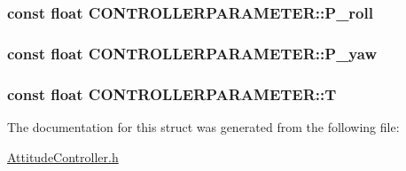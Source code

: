 \subsubsection[{\texorpdfstring{P\+\_\+roll}{P_roll}}]{\setlength{\rightskip}{0pt plus 5cm}const float C\+O\+N\+T\+R\+O\+L\+L\+E\+R\+P\+A\+R\+A\+M\+E\+T\+E\+R\+::\+P\+\_\+roll}\hypertarget{struct_c_o_n_t_r_o_l_l_e_r_p_a_r_a_m_e_t_e_r_a146c938d6d8675608d33ce61d2304000}{}\label{struct_c_o_n_t_r_o_l_l_e_r_p_a_r_a_m_e_t_e_r_a146c938d6d8675608d33ce61d2304000}
\subsubsection[{\texorpdfstring{P\+\_\+yaw}{P_yaw}}]{\setlength{\rightskip}{0pt plus 5cm}const float C\+O\+N\+T\+R\+O\+L\+L\+E\+R\+P\+A\+R\+A\+M\+E\+T\+E\+R\+::\+P\+\_\+yaw}\hypertarget{struct_c_o_n_t_r_o_l_l_e_r_p_a_r_a_m_e_t_e_r_a1d339345180b617cd8ab579c614c8896}{}\label{struct_c_o_n_t_r_o_l_l_e_r_p_a_r_a_m_e_t_e_r_a1d339345180b617cd8ab579c614c8896}
\subsubsection[{\texorpdfstring{T}{T}}]{\setlength{\rightskip}{0pt plus 5cm}const float C\+O\+N\+T\+R\+O\+L\+L\+E\+R\+P\+A\+R\+A\+M\+E\+T\+E\+R\+::T}\hypertarget{struct_c_o_n_t_r_o_l_l_e_r_p_a_r_a_m_e_t_e_r_aff46f1549c4457b9b1dbdc777c0949e5}{}\label{struct_c_o_n_t_r_o_l_l_e_r_p_a_r_a_m_e_t_e_r_aff46f1549c4457b9b1dbdc777c0949e5}


The documentation for this struct was generated from the following file\+:\begin{DoxyCompactItemize}
\item 
\hyperlink{_attitude_controller_8h}{Attitude\+Controller.\+h}\end{DoxyCompactItemize}
